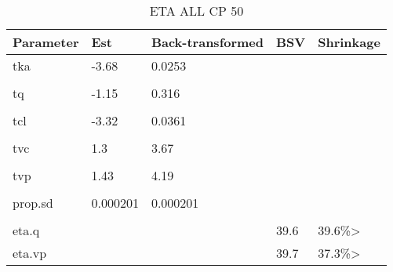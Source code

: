 \begin{table}
\centering\centering
\caption{ETA ALL CP 50}
\centering
\fontsize{8}{10}\selectfont
\begin{tabular}[t]{lllll}
\toprule
\textbf{Parameter} & \textbf{Est} & \textbf{Back-transformed} & \textbf{BSV} & \textbf{Shrinkage}\\
\midrule
tka & -3.68 & 0.0253 &  & \\
\midrule\\
tq & -1.15 & 0.316 &  & \\
\midrule\\
tcl & -3.32 & 0.0361 &  & \\
\midrule\\
tvc & 1.3 & 3.67 &  & \\
\midrule\\
tvp & 1.43 & 4.19 &  & \\
\midrule\\
prop.sd & 0.000201 & 0.000201 &  & \\
\midrule\\
eta.q &  &  & 39.6 & 39.6\%>\\
\midrule
eta.vp &  &  & 39.7 & 37.3\%>\\
\bottomrule
\end{tabular}
\end{table}